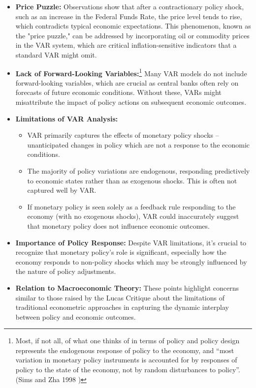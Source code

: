 \begin{itemize}
    \item \textbf{Price Puzzle:} Observations show that after a contractionary policy shock, such as an increase in the Federal Funds Rate, 
    the price level tends to rise, which contradicts typical economic expectations. This phenomenon, known as the "price puzzle," 
    can be addressed by incorporating oil or commodity prices in the VAR system, 
    which are critical inflation-sensitive indicators that a standard VAR might omit.

    \item \textbf{Lack of Forward-Looking Variables:}\footnote{Most, if not all,
    of what one thinks of in terms of policy and policy design represents the endogenous response of policy
    to the economy, and “most variation in monetary policy instruments is accounted for by responses of
    policy to the state of the economy, not by random disturbances to policy”. (Sims and Zha 1998 \cite{sims1998bayesian})} 
    Many VAR models do not include forward-looking variables, 
    which are crucial as central banks often rely on forecasts of future economic conditions. 
    Without these, VARs might misattribute the impact of policy actions on subsequent economic outcomes.

    \item \textbf{Limitations of VAR Analysis:}
    \begin{itemize}
        \item VAR primarily captures the effects of monetary policy shocks -- unanticipated changes in policy which are not a response to the economic conditions.
        \item The majority of policy variations are endogenous, responding predictively to economic states rather than as exogenous shocks. 
        This is often not captured well by VAR.
        \item If monetary policy is seen solely as a feedback rule responding to the economy (with no exogenous shocks), 
        VAR could inaccurately suggest that monetary policy does not influence economic outcomes.
    \end{itemize}
    
    \item \textbf{Importance of Policy Response:} Despite VAR limitations, it's crucial to recognize that monetary policy's role is significant, 
    especially how the economy responds to non-policy shocks which may be strongly influenced by the nature of policy adjustments.

    \item \textbf{Relation to Macroeconomic Theory:} These points highlight concerns similar to those raised by the Lucas Critique about the limitations 
    of traditional econometric approaches in capturing the dynamic interplay between policy and economic outcomes.
\end{itemize}



